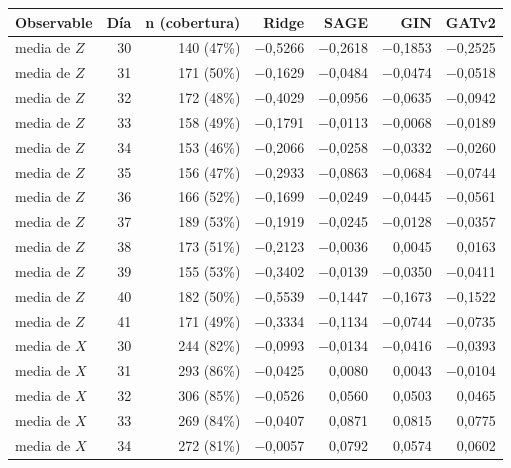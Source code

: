 \begin{table}[htbp]
    \centering
    {\footnotesize
    \begin{tabular}{@{}lrrrrrr@{}}
        \toprule
        \textbf{Observable} & \textbf{Día} & \textbf{n (cobertura)} & \textbf{Ridge} & \textbf{SAGE} & \textbf{GIN} & \textbf{GATv2} \\
        \midrule
        media de $Z$ & 30 & 140 (47\%) & $-$0,5266 & $-$0,2618 & $-$0,1853 & $-$0,2525 \\
        media de $Z$ & 31 & 171 (50\%) & $-$0,1629 & $-$0,0484 & $-$0,0474 & $-$0,0518 \\
        media de $Z$ & 32 & 172 (48\%) & $-$0,4029 & $-$0,0956 & $-$0,0635 & $-$0,0942 \\
        media de $Z$ & 33 & 158 (49\%) & $-$0,1791 & $-$0,0113 & $-$0,0068 & $-$0,0189 \\
        media de $Z$ & 34 & 153 (46\%) & $-$0,2066 & $-$0,0258 & $-$0,0332 & $-$0,0260 \\
        media de $Z$ & 35 & 156 (47\%) & $-$0,2933 & $-$0,0863 & $-$0,0684 & $-$0,0744 \\
        media de $Z$ & 36 & 166 (52\%) & $-$0,1699 & $-$0,0249 & $-$0,0445 & $-$0,0561 \\
        media de $Z$ & 37 & 189 (53\%) & $-$0,1919 & $-$0,0245 & $-$0,0128 & $-$0,0357 \\
        media de $Z$ & 38 & 173 (51\%) & $-$0,2123 & $-$0,0036 & 0,0045 & 0,0163 \\
        media de $Z$ & 39 & 155 (53\%) & $-$0,3402 & $-$0,0139 & $-$0,0350 & $-$0,0411 \\
        media de $Z$ & 40 & 182 (50\%) & $-$0,5539 & $-$0,1447 & $-$0,1673 & $-$0,1522 \\
        media de $Z$ & 41 & 171 (49\%) & $-$0,3334 & $-$0,1134 & $-$0,0744 & $-$0,0735 \\
        media de $X$ & 30 & 244 (82\%) & $-$0,0993 & $-$0,0134 & $-$0,0416 & $-$0,0393 \\
        media de $X$ & 31 & 293 (86\%) & $-$0,0425 & 0,0080 & 0,0043 & $-$0,0104 \\
        media de $X$ & 32 & 306 (85\%) & $-$0,0526 & 0,0560 & 0,0503 & 0,0465 \\
        media de $X$ & 33 & 269 (84\%) & $-$0,0407 & 0,0871 & 0,0815 & 0,0775 \\
        media de $X$ & 34 & 272 (81\%) & $-$0,0057 & 0,0792 & 0,0574 & 0,0602 \\

\end{tabular}}
\end{table}
